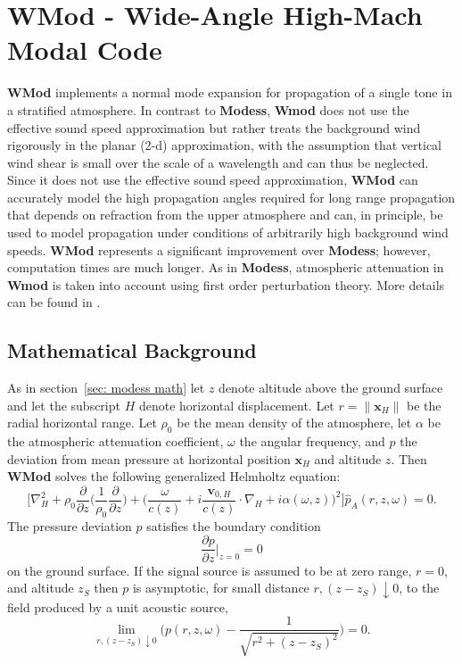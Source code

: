 \section{WMod - Wide-Angle High-Mach Modal Code}

{\bf WMod} implements a normal mode expansion for propagation of a single tone in a stratified atmosphere. In contrast to {\bf Modess}, {\bf Wmod} does not use the effective sound speed approximation but rather treats the background wind rigorously in the planar (2-d) approximation, with the assumption that vertical wind shear is small over the scale of a wavelength and can thus be neglected. Since it does not use the effective sound speed approximation, {\bf WMod} can accurately model the high propagation angles required for long range propagation that depends on refraction from the upper atmosphere and can, in principle, be used to model propagation under conditions of arbitrarily high background wind speeds. {\bf WMod} represents a significant improvement over {\bf Modess}; however, computation times are much longer. As in {\bf Modess}, atmospheric attenuation in {\bf Wmod} is taken into account using first order perturbation theory. More details can be found in \cite{assink_dissertation}.

\subsection{Mathematical Background}
\label{sec: wmod math}
As in section~\ref{sec: modess math} let $z$ denote altitude above the ground surface and let the subscript $H$ denote horizontal displacement. Let $r=\|\textbf{x}_{H}\|$ be the radial horizontal range. Let $\rho_0$ be the mean density of the atmosphere, let $\alpha$ be the atmospheric attenuation coefficient, $\omega$ the angular frequency, and $p$ the deviation from mean pressure at horizontal position $\textbf{x}_{H}$ and altitude $z$. Then {\bf WMod} solves the following generalized Helmholtz equation: 
\begin{equation}
\Big[ 
\nabla_{H}^2 
+ 
\rho_0 \frac{\partial}{\partial z} \Big(\frac{1}{\rho_0} \frac{\partial}{\partial z} \Big) 
+
\Big(\frac{\omega}{c(z)}+ i\frac{\textbf{v}_{0,H}}{c(z)} \cdot \nabla_{H}+i\alpha(\omega,z)\Big)^2 
\Big] \hat{p}_A(r,z,\omega) = 0.
\label{eq: full planar Helmholtz}
\end{equation}
The pressure deviation $p$ satisfies the boundary condition 
\[
\frac {\partial p}{\partial z}\Big |_{z=0}= 0
\]
on the ground surface. If the signal source is assumed to be at zero range, $r=0$, and altitude $z_S$ then $p$ is asymptotic, for small distance $r,(z-z_S)\downarrow 0$, to the field produced by a unit acoustic source, 
\[
\lim_{r,(z-z_S)\downarrow0}\Big(p(r,z,\omega)-\frac{1}{\sqrt{r^2+(z-z_S)^2}}\Big)=0.
\]

